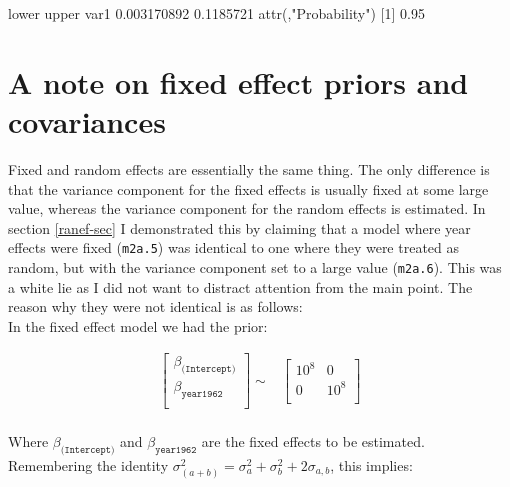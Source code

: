 \documentclass{article}
\begin{document}
\begin{Schunk}
\begin{Soutput}
           lower     upper
var1 0.003170892 0.1185721
attr(,"Probability")
[1] 0.95
\end{Soutput}
\end{Schunk}


\section{A note on fixed effect priors and covariances}
\label{PriorContr-sec}

Fixed and random effects are essentially the same thing. The only difference is that the variance component for the fixed effects is usually fixed at some large value, whereas the variance component for the random effects is estimated.  In section \ref{ranef-sec} I demonstrated this by claiming that a model where year effects were fixed (\texttt{m2a.5}) was identical to one where they were treated as random, but with the variance component set to a large value (\texttt{m2a.6}). This was a white lie as I did not want to distract attention from the main point. The reason why they were not identical is as follows:\\

In the fixed effect model we had the prior:  

\begin{equation}
\begin{array}{rcl}
\left[
\begin{array}{c}
 \beta_{\texttt{(Intercept)}}\\
 \beta_{\texttt{year1962}}\\
\end{array}
\right]
\sim
&
\left[
\begin{array}{cc}
10^8&0\\
0&10^8\\
\end{array}
\right]\\
\end{array}
\end{equation}

Where $\beta_{\texttt{(Intercept)}}$ and $\beta_{\texttt{year1962}}$ are the fixed effects to be estimated.\\

Remembering the identity  $\sigma^{2}_{(a+b)} = \sigma^{2}_{a}+ \sigma^{2}_{b}+2\sigma_{a,b}$, this implies:
\end{document}
